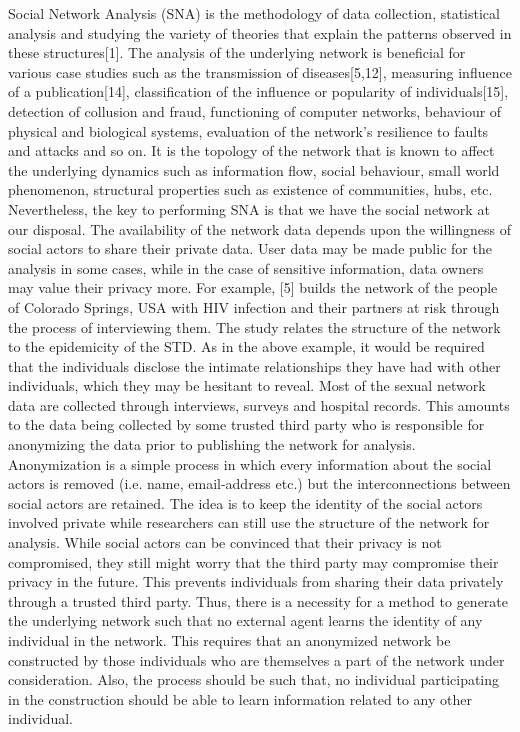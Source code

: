 \documentclass{llncs}
\begin{document}
Social Network Analysis (SNA) is the methodology of data collection, statistical analysis and studying the variety of 
theories that explain the patterns observed in these structures[1]. The analysis of the underlying network is beneficial 
for various case studies such as the transmission of diseases[5,12], measuring influence of a publication[14], 
classification of the influence or popularity of individuals[15], detection of collusion and fraud, functioning of 
computer networks, behaviour of physical and biological systems, evaluation of the network’s resilience to faults and 
attacks and so on. It is the topology of the network that is known to affect the underlying dynamics such as information 
flow, social behaviour, small world phenomenon, structural properties such as existence of communities, hubs, etc. 
Nevertheless, the key to performing SNA is that we have the social network at our disposal. The availability of the 
network data depends upon the willingness of social actors to share their private data. User data may be made public 
for the analysis in some cases, while in the case of sensitive information, data owners may value their privacy more. 
For example, [5] builds the network of the people of Colorado Springs, USA with HIV infection and their partners at risk 
through the process of interviewing them. The study relates the structure of the network to the epidemicity of the STD. 
As in the above example, it would be required that the individuals disclose the intimate relationships they have had 
with other individuals, which they may be hesitant to reveal. Most of the sexual network data are collected through 
interviews, surveys and hospital records. This amounts to the data being collected by some trusted third party who is 
responsible for anonymizing the data prior to publishing the network for analysis. Anonymization is a simple process in 
which every information about the social actors is removed (i.e. name, email-address etc.) but the interconnections 
between social actors are retained. The idea is to keep the identity of the social actors involved private while 
researchers can still use the structure of the network for analysis. While social actors can be convinced that their 
privacy is not compromised, they still might worry that the third party may compromise their privacy in the future. 
This prevents individuals from sharing their data privately through a trusted third party. Thus, there is a necessity 
for a method to generate the underlying network such that no external agent learns the identity of any individual in the 
network. This requires that an anonymized network be constructed by those individuals who are themselves a part of the 
network under consideration. Also, the process should be such that, no individual participating in the construction should 
be able to learn information related to any other individual. \\
\end{document}
